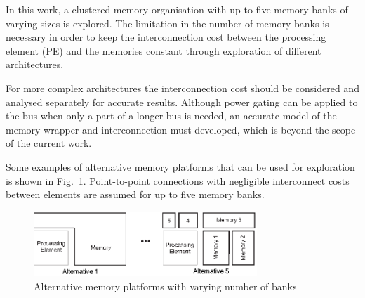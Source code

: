 \documentclass[smallcondensed]{svjour3}
\begin{document}
In this work, a clustered memory organisation with up to five memory banks of varying sizes is explored. 
The limitation in the number of memory banks is necessary in order to keep the interconnection cost between the processing element (PE) and the memories constant through exploration of different architectures. 

For more complex architectures the interconnection cost should be considered and analysed separately for accurate results. 
Although power gating can be applied to the bus when only a part of a longer bus is needed, an accurate model of the memory wrapper and interconnection must developed, which is beyond the scope of the current work. 

Some examples of alternative memory platforms that can be used for exploration is shown in Fig.~\ref{fig:platform}. 
Point-to-point connections with negligible interconnect costs between elements are assumed for up to five memory banks.

\begin{figure}
\centering
\includegraphics[width=0.75\textwidth]{Images/platform.eps}
\caption{Alternative memory platforms with varying number of banks}
\label{fig:platform}
\end{figure}
\end{document}
